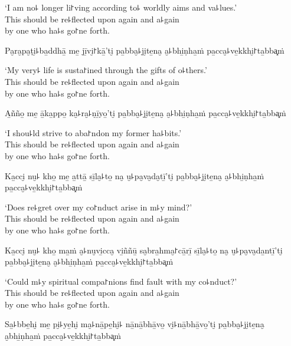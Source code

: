 \begin{english}
  `I am no꜕ longer li꜓ving according to꜕ worldly aims and va꜕lues.'\\
  This should be re꜕flected upon again and a꜕gain\\
  by one who ha꜕s go꜓ne forth.
\end{english}

Pa̮ra̮pa̮ṭi̮꜕ba̱ddhā̱ me̱ jī̱vi̮꜓kā̱'ti̮ pa̱bba̮꜕ji̮te̱na̮ a̮꜕bhi̱ṇha̱ṁ pa̱cca̮꜕ve̱kkhi̮꜓ta̱bba͓ṁ

\begin{english}
  `My very꜕ life is susta꜓ined through the gifts of o꜕thers.'\\
  This should be re꜕flected upon again and a꜕gain\\
  by one who ha꜕s go꜓ne forth.
\end{english}

A̱ñño̱ me̱ ā̱ka̱ppo̱ ka̮꜕ra̮꜕ṇī̱yo̱'ti̮ pa̱bba̮꜕ji̮te̱na̮ a̮꜕bhi̱ṇha̱ṁ pa̱cca̮꜕ve̱kkhi̮꜓ta̱bba͓ṁ

\begin{english}
  `I shou꜕ld strive to aba꜓ndon my former ha꜕bits.'\\
  This should be re꜕flected upon again and a꜕gain\\
  by one who ha꜕s go꜓ne forth.
\end{english}

\clearpage

Ka̱cci̮ nu̮꜕ kho̱ me̱ a̱ttā̱ sī̱la̮꜕to̱ na̮ u̮꜕pa̮va̮da̮tī̱'ti̮ pa̱bba̮꜕ji̮te̱na̮ a̮꜕bhi̱ṇha̱ṁ pa̱cca̮꜕ve̱kkhi̮꜓ta̱bba͓ṁ

\begin{english}
  `Does re꜕gret over my co꜓nduct arise in m꜕y mind?'\\
  This should be re꜕flected upon again and a꜕gain\\
  by one who ha꜕s go꜓ne forth.
\end{english}

Ka̱cci̮ nu̮꜕ kho̱ ma̱ṁ a̮꜕nu̮vi̱cca̮ vi̱ññū̱ sa̮bra̱hma̮꜓cā̱rī̱ sī̱la̮꜕to̱ na̮ u̮꜕pa̮va̮da̱ntī̱'ti̮ pa̱bba̮꜕ji̮te̱na̮ a̮꜕bhi̱ṇha̱ṁ pa̱cca̮꜕ve̱kkhi̮꜓ta̱bba͓ṁ

\begin{english}
  `Could m꜕y spiritual compa꜓nions find fault with my co꜕nduct?'\\
  This should be re꜕flected upon again and a꜕gain\\
  by one who ha꜕s go꜓ne forth.
\end{english}

Sa̱꜕bbe̱hi̮ me̱ pi̮꜕ye̱hi̮ ma̮꜕nā̱pe̱hi̮꜕ nā̱nā̱bhā̱vo̱ vi̮꜕nā̱bhā̱vo̱'ti̮ pa̱bba̮꜕ji̮te̱na̮ a̮bhi̱ṇha̱ṁ pa̱cca̮꜕ve̱kkhi̮꜓ta̱bba͓ṁ

